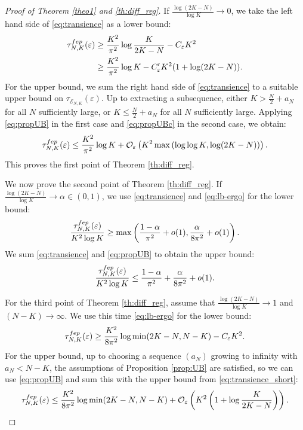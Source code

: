 \documentclass[11pt,a4paper]{article}
\newcommand{\FEP}{\textsc{fep}}
\newcommand{\eqs}[1]{\begin{equation}#1\end{equation}}
\begin{document}
\begin{proof}[Proof of Theorem \ref{theo1} and \ref{th:diff_reg}]
If $\frac{\log (2K-N)}{\log K} \to 0$, we take the left hand side of \eqref{eq:transience} as a lower bound:
\begin{align}
\tau_{N,K}^{\FEP}(\varepsilon) &\ge \frac{K^2}{\pi^2} \log \frac{K}{2K-N} - C_{\varepsilon}K^2 \nonumber \\
& \ge \frac{K^2}{\pi^2} \log K - C'_{\varepsilon}K^2 (1+\log (2K-N)). \label{eq:lbcrit}
\end{align} 
For the upper bound, we sum the right hand side of \eqref{eq:transience} to a suitable upper bound on $\tau_{\mathcal{E}_{N,K}}(\varepsilon)$. Up to extracting a subsequence, either $K > \frac{N}{2} + a_N$ for all $N$ sufficiently large, or $K \le \frac{N}{2} + a_N$ for all $N$ sufficiently large. Applying \eqref{eq:propUB} in the first case and \eqref{eq:propUBc} in the second case, we obtain:
\eqs{\tau_{N,K}^{\FEP}(\varepsilon) \le \frac{K^2}{\pi^2}\log K + \mathcal{O}_{\varepsilon}\left(K^2 \max\left(\log \log K, \log(2K-N)\right)\right).}
This proves the first point of Theorem \ref{th:diff_reg}.

We now prove the second point of Theorem \ref{th:diff_reg}. If $\frac{\log(2K-N)}{\log K} \to \alpha \in (0,1)$, we use \eqref{eq:transience} and \eqref{eq:lb-ergo} for the lower bound:
\eqs{\frac{\tau_{N,K}^{\FEP}(\varepsilon)}{K^2\log K} \ge \max\left(\frac{1-\alpha}{\pi^2}  + o(1) , \frac{\alpha}{8\pi^2} + o(1) \right).}
We sum \eqref{eq:transience} and \eqref{eq:propUB} to obtain the upper bound:
\eqs{\frac{\tau_{N,K}^{\FEP}(\varepsilon)}{K^2\log K} \le \frac{1-\alpha}{\pi^2} + \frac{\alpha}{8\pi^2} + o(1).}

For the third point of Theorem \ref{th:diff_reg}, assume that $\frac{\log (2K-N)}{\log K} \to 1$ and $(N-K) \to \infty$. We use this time \eqref{eq:lb-ergo} for the lower bound:
\eqs{\tau_{N,K}^{\FEP}(\varepsilon) \ge \frac{K^2}{8\pi^2} \log \min (2K-N,N-K) - C_\varepsilon K^2 .}
For the upper bound, up to choosing a sequence $(a_N)$ growing to infinity with $a_N<N-K$, the assumptions of Proposition \ref{prop:UB} are satisfied, so we can use \eqref{eq:propUB} and sum this with the upper bound from \eqref{eq:transience_short}: 
\eqs{\tau_{N,K}^{\FEP}(\varepsilon) \le \frac{K^2}{8\pi^2}\log \min(2K-N,N-K) + \mathcal{O}_\varepsilon\left(K^2\left(1+\log \frac{K}{2K-N}\right)\right).}


\end{proof}
\end{document}
